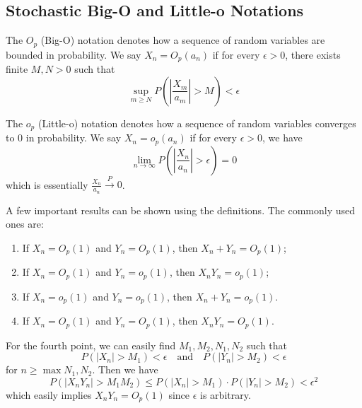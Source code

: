 \documentclass{article}
\begin{document}
\subsection{Stochastic Big-O and Little-o Notations}
\begin{definition}
    The $O_p$ (Big-O) notation denotes how a sequence of random variables are bounded in probability. We say $X_n = O_p(a_n)$ if for every $\epsilon > 0$, there exists finite $M, N > 0$ such that
    \begin{equation}
        \sup_{m \geq N} P\left( \left|\frac{X_m}{a_m}\right| > M \right) < \epsilon
    \end{equation}
\end{definition}
\begin{definition}
    The $o_p$ (Little-o) notation denotes how a sequence of random variables converges to 0 in probability. We say $X_n = o_p(a_n)$ if for every $\epsilon > 0$, we have
    \begin{equation}
        \lim_{n \to \infty}P\left( \left|\frac{X_n}{a_n}\right| > \epsilon \right) = 0
    \end{equation}
    which is essentially $\frac{X_n}{a_n} \xrightarrow{P} 0$.
\end{definition}
A few important results can be shown using the definitions. The commonly used ones are:
\begin{enumerate}
    \item If $X_n = O_p(1)$ and $Y_n = O_p(1)$, then $X_n + Y_n = O_p(1)$;
    \item If $X_n = O_p(1)$ and $Y_n = o_p(1)$, then $X_nY_n = o_p(1)$;
    \item If $X_n = o_p(1)$ and $Y_n = o_p(1)$, then $X_n + Y_n = o_p(1)$.
    \item If $X_n = O_p(1)$ and $Y_n = O_p(1)$, then $X_nY_n = O_p(1)$.
\end{enumerate}
For the fourth point, we can easily find $M_1, M_2, N_1, N_2$ such that
\begin{equation}
    P\left( \left|X_n\right| > M_1 \right) < \epsilon \quad \text{and} \quad P\left( \left|Y_n\right| > M_2 \right) < \epsilon
\end{equation}
for $n \geq \max{N_1, N_2}$. Then we have
\begin{equation}
    P\left( \left|X_nY_n\right| > M_1M_2 \right) \leq P\left( \left|X_n\right| > M_1 \right) \cdot P\left( \left|Y_n\right| > M_2 \right) < \epsilon^2
\end{equation}
which easily implies $X_nY_n = O_p(1)$ since $\epsilon$ is arbitrary.
\newpage
\end{document}

